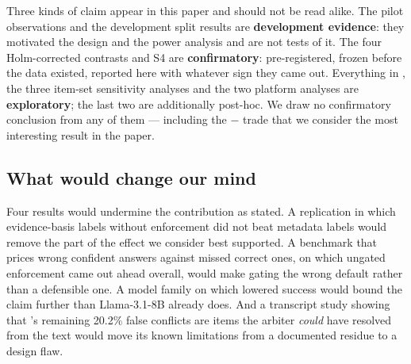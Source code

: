 Three kinds of claim appear in this paper and should not be read alike. The pilot observations and the development
split results are \textbf{development evidence}: they motivated the design and the power analysis and are not
tests of it. The four Holm-corrected contrasts and S4 are \textbf{confirmatory}: pre-registered, frozen before the
data existed, reported here with whatever sign they came out. Everything in , the three
item-set sensitivity analyses and the two platform analyses are \textbf{exploratory}; the last two are
additionally post-hoc. We draw no confirmatory conclusion from any of them --- including the
 $-$  trade that we consider the most interesting result in the paper.

\subsection{What would change our mind}

Four results would undermine the contribution as stated. A replication in which evidence-basis labels without
enforcement did not beat metadata labels would remove the part of the effect we consider best supported. A
benchmark that prices wrong confident answers against missed correct ones, on which ungated enforcement came out
ahead overall, would make gating the wrong default rather than a defensible one. A model family on which
 lowered success would bound the claim further than Llama-3.1-8B already does. And a transcript study
showing that 's remaining 20.2\% false conflicts are items the arbiter \emph{could} have resolved from
the text would move its known limitations from a documented residue to a design flaw.
